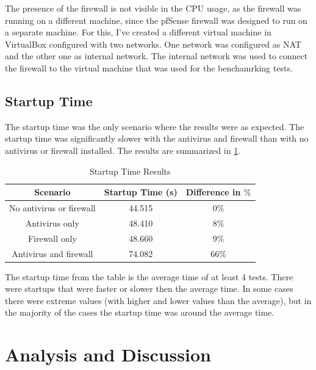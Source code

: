 \documentclass[runningheads,a4paper,english]{llncs}[2022/01/12]
\begin{document}
\par The presence of the firewall is not visible in the CPU usage, as the
firewall was running on a different machine, since the pfSense firewall
was designed to run on a separate machine. For this, I've created a different
virtual machine in VirtualBox configured with two networks. One network was
configured as NAT and the other one as internal network. The internal network
was used to connect the firewall to the virtual machine that was used for the
benchamrking tests.

\subsection{Startup Time}\label{sec:startup}

\par The startup time was the only scenario where the results were as expected.
The startup time was significantly slower with the antivirus and firewall than
with no antivirus or firewall installed. The results are summarized in
\cref{tab:startup}.

\begin{table}[h]
\centering
  \begin{tabular}{|c|c|c|}
    \hline
    Scenario & Startup Time (s) & Difference in $\%$ \\
    \hline
    No antivirus or firewall & 44.515 & 0\% \\
    Antivirus only & 48.410 & 8\% \\
    Firewall only & 48.660 & 9\% \\
    Antivirus and firewall & 74.082 & 66\% \\
    \hline
  \end{tabular}
  \caption{Startup Time Results}
  \label{tab:startup}
\end{table}

\par The startup time from the table is the average time of at least 4 tests.
There were startups that were faster or slower then the average time. In some
cases there were extreme values (with higher and lower values than the average),
but in the majority of the cases the startup time was around the average time.


\section{Analysis and Discussion}\label{sec:discussion}
\end{document}
